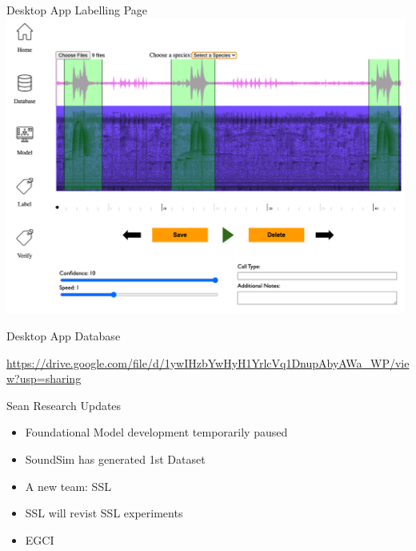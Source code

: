 \begin{frame}{Desktop App Labelling Page}
    \centering
    \includegraphics[height=0.99\textheight,width=0.99\textwidth,keepaspectratio]{images/labelling_page.png}
\end{frame}

\begin{frame}{Desktop App Database}

    \url{https://drive.google.com/file/d/1ywIHzbYwHyH1YrlcVq1DnupAbyAWa_WP/view?usp=sharing}

\end{frame}


\begin{frame}{Sean Research Updates}
    \begin{itemize}
        \item Foundational Model development temporarily paused
        \item SoundSim has generated 1st Dataset
        \item A new team: SSL
        \item SSL will revist SSL experiments
        \item EGCI
    \end{itemize}
\end{frame}


